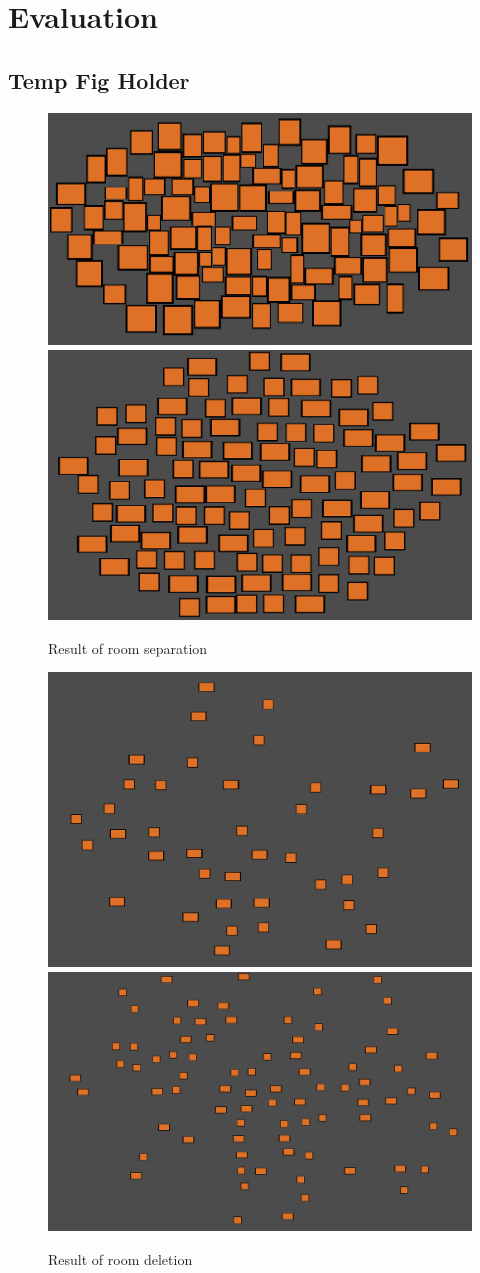 \documentclass{article}
\begin{document}
\section{Evaluation}

\pagebreak
\subsection{Temp Fig Holder}

\begin{figure}
\centering
\includegraphics[height = 0.2\textwidth]{rooms seperated}
\includegraphics[height = 0.2\textwidth]{spread rooms}
\caption{Result of room separation}
\label{room seperation result}
\end{figure}

\begin{figure}
\centering
\includegraphics[height = 0.3\textwidth]{deleted rooms}
\includegraphics[height = 0.3\textwidth]{deleted rooms1}
\caption{Result of room deletion}
\label{room deletion result}
\end{figure}
\end{document}
